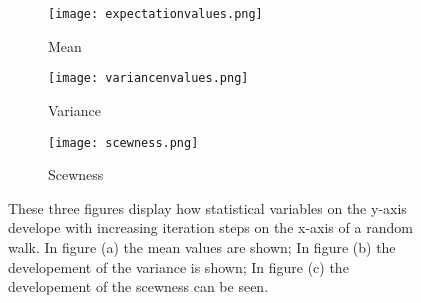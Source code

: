 \documentclass{article}[a4paper]
\begin{document}
\begin{figure}
    \centering
    \begin{subfigure}{0.4\textwidth}
       \texttt{[image: expectationvalues.png]} 
       \caption{Mean}
    \end{subfigure}
    \hfill 
    \begin{subfigure}{0.4\textwidth}
        \texttt{[image: variancenvalues.png]}
        \caption{Variance}
    \end{subfigure} 
    \hfill 
    \begin{subfigure}{0.4\textwidth}
        \texttt{[image: scewness.png]}
        \caption{Scewness}
    \end{subfigure}
    \caption{These three figures display how statistical variables on the y-axis develope with increasing iteration steps on the x-axis of a random walk. In figure (a) the mean values are shown; In figure (b) the developement of the variance is shown; In figure (c) the developement of the scewness can be seen.}
\end{figure}
\end{document}
